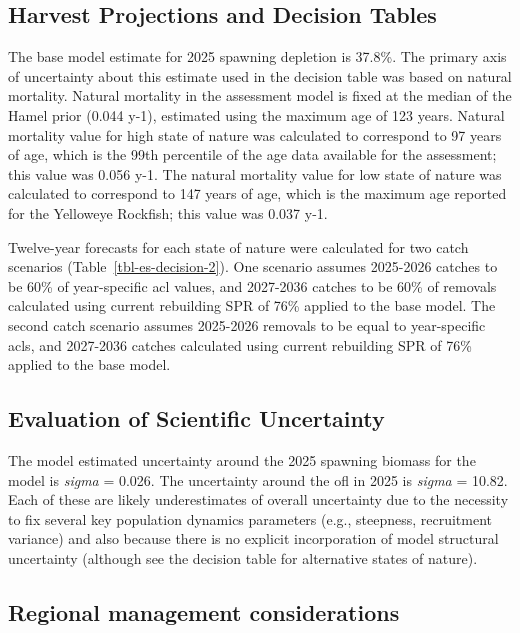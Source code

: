\documentclass[
]{scrartcl}
\begin{document}
\subsection{Harvest Projections and Decision
Tables}\label{harvest-projections-and-decision-tables}

The base model estimate for 2025 spawning depletion is 37.8\%. The
primary axis of uncertainty about this estimate used in the decision
table was based on natural mortality. Natural mortality in the
assessment model is fixed at the median of the Hamel prior (0.044 y-1),
estimated using the maximum age of 123 years. Natural mortality value
for high state of nature was calculated to correspond to 97 years of
age, which is the 99th percentile of the age data available for the
assessment; this value was 0.056 y-1. The natural mortality value for
low state of nature was calculated to correspond to 147 years of age,
which is the maximum age reported for the Yelloweye Rockfish; this value
was 0.037 y-1.

Twelve-year forecasts for each state of nature were calculated for two
catch scenarios (Table~\ref{tbl-es-decision-2}). One scenario assumes
2025-2026 catches to be 60\% of year-specific \gls{acl} values, and
2027-2036 catches to be 60\% of removals calculated using current
rebuilding SPR of 76\% applied to the base model. The second catch
scenario assumes 2025-2026 removals to be equal to year-specific
\gls{acl}s, and 2027-2036 catches calculated using current rebuilding
SPR of 76\% applied to the base model.

\subsection{Evaluation of Scientific
Uncertainty}\label{evaluation-of-scientific-uncertainty}

The model estimated uncertainty around the 2025 spawning biomass for the
model is \emph{sigma} = 0.026. The uncertainty around the \gls{ofl} in
2025 is \emph{sigma} = 10.82. Each of these are likely underestimates of
overall uncertainty due to the necessity to fix several key population
dynamics parameters (e.g., steepness, recruitment variance) and also
because there is no explicit incorporation of model structural
uncertainty (although see the decision table for alternative states of
nature).

\subsection{Regional management
considerations}\label{regional-management-considerations}
\end{document}
